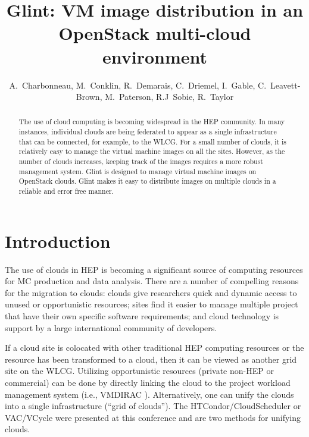 \documentclass[a4paper]{jpconf}
\begin{document}
\linenumbers

\title{Glint: VM image distribution in an OpenStack multi-cloud environment}

\author{A.~Charbonneau, M.~Conklin, R.~Demarais, C.~Driemel, I.~Gable, C.~Leavett-Brown, 
M.~Paterson, R.J~Sobie, R.~Taylor}

\address{University of Victoria, Victoria, Canada}


\begin{abstract}
The use of cloud computing is becoming widespread in the HEP community. In many instances, individual clouds are being federated to appear as a single infrastructure that can be connected, for example, to the WLCG. For a small number of clouds, it is relatively easy to manage the virtual machine images on all the sites. However, as the number of clouds increases, keeping track of the images requires a more robust management system. Glint is designed to manage virtual machine images on OpenStack clouds. Glint makes it easy to distribute images on multiple clouds in a reliable and error free manner. 
\end{abstract}

\section{Introduction}

The use of clouds in HEP is becoming a significant source of computing resources for MC production and data analysis.
There are a number of compelling reasons for the migration to clouds: clouds give researchers quick and dynamic access to unused or opportunistic resources;  sites find it easier to manage multiple project that have their own specific software requirements; and cloud technology is support by a large international community of developers.

If a cloud site is colocated with other traditional HEP computing resources or the resource has been transformed to a cloud, then it can be viewed as another grid site on the WLCG. Utilizing opportunistic resources (private non-HEP or commercial) can be done by directly linking the cloud to the project workload management system (i.e., VMDIRAC \cite{vmdirac}). Alternatively, one can unify the clouds into a single infrastructure (``grid of clouds''). The HTCondor/CloudScheduler \cite{chep:gable-talk} or VAC/VCycle \cite{chep:vac-vcycle} were presented at this conference and are two methods for unifying clouds.
 
\end{document}
